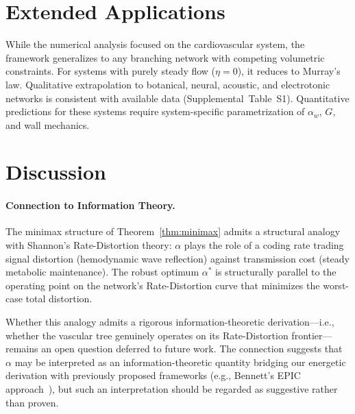 \documentclass[11pt,a4paper]{article}
\theoremstyle{remark}
\begin{document}
\section{Extended Applications}
\label{sec:applications}

While the numerical analysis focused on the cardiovascular system, the framework
generalizes to any branching network with competing volumetric constraints. For
systems with purely steady flow ($\eta = 0$), it reduces to Murray's law.
Qualitative extrapolation to botanical, neural, acoustic, and electrotonic
networks is consistent with available data (Supplemental~Table~S1). Quantitative
predictions for these systems require system-specific parametrization of
$\alpha_w$, $G$, and wall mechanics.

\section{Discussion}
\label{sec:discussion}

\paragraph{Connection to Information Theory.}
The minimax structure of Theorem~\ref{thm:minimax} admits a structural analogy
with Shannon's Rate-Distortion theory: $\alpha$ plays the role of a coding rate
trading signal distortion (hemodynamic wave reflection) against transmission
cost (steady metabolic maintenance). The robust optimum $\alpha^*$ is
structurally parallel to the operating point on the network's Rate-Distortion
curve that minimizes the worst-case total distortion.

Whether this analogy admits a rigorous information-theoretic derivation---i.e.,
whether the vascular tree genuinely operates on its Rate-Distortion
frontier---remains an open question deferred to future work. The connection
suggests that $\alpha$ may be interpreted as an information-theoretic quantity
bridging our energetic derivation with previously proposed frameworks (e.g.,
Bennett's EPIC approach~\cite{bennett2025}), but such an
interpretation should be regarded as suggestive rather than proven.
\end{document}
